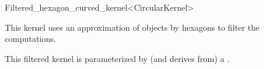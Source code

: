 \begin{ccRefClass}{Filtered_hexagon_curved_kernel<CircularKernel>}

\ccDefinition

This kernel uses an approximation of objects by hexagons to filter the computations. 


\ccIsModel


\ccParameters

This filtered kernel is parameterized by (and derives from) a . 

\end{ccRefClass}
